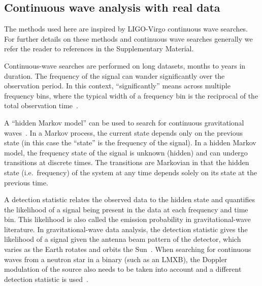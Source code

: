 \documentclass[paper-main.tex]{subfiles}
\begin{document}
\subsection{Continuous wave analysis with real data}
\label{sec:realCWSearches}


The methods used here are inspired by LIGO-Virgo continuous wave searches. 
For further details on these methods and continuous wave searches generally we refer the reader to references in the Supplementary Material. 


Continuous-wave searches are performed on long datasets, months to years in duration. 
The frequency of the signal can wander significantly over the observation period. 
In this context, ``significantly'' means across multiple frequency bins, where the typical width of a frequency bin is the reciprocal of the total observation time~\cite{JKS:1998,ScoX1O2Viterbi:2019}.


A ``hidden Markov model'' can be used to search for continuous gravitational waves~\cite{SuvorovaEtAl:2017}. 
In a Markov process, the current state depends only on the previous state (in this case the ``state'' is the frequency of the signal). 
In a hidden Markov model, the frequency state of the signal is unknown (hidden) and can undergo transitions at discrete times. 
The transitions are Markovian in that the hidden state (i.e.\ frequency) of the system at any time depends solely on its state at the previous time. 


A detection statistic relates the observed data to the hidden state and quantifies the likelihood of a signal being present in the data at each frequency and time bin.
This likelihood is also called the emission probability in gravitational-wave literature.  
In gravitational-wave data analysis, the detection statistic gives the likelihood of a signal given the antenna beam pattern of the detector, which varies as the Earth rotates and orbits the Sun~\cite{JKS:1998}.
When searching for continuous waves from a neutron star in a binary (such as an LMXB), the Doppler modulation of the source also needs to be taken into account and a different detection statistic is used~\cite{SuvorovaEtAl:2017}. 
\end{document}
